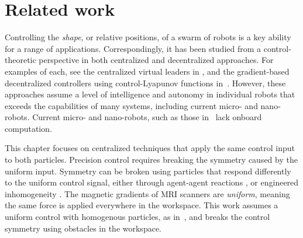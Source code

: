 
\section{Related work}\label{sec:RelatedWork}

Controlling the \emph{shape}, or relative positions, of a swarm of robots is a key ability for a range of applications.  Correspondingly, it has been studied from a control-theoretic perspective in  both centralized and decentralized approaches. For examples of each, see the centralized virtual leaders in \cite{egerstedt2001formation}, and the  gradient-based decentralized controllers  using control-Lyapunov functions in~\cite{hsieh2008decentralized}. However, these approaches assume a level of intelligence and autonomy in individual robots that exceeds the capabilities of many systems, including current micro- and nano-robots.  Current micro- and nano-robots, such as those in~\cite{Chowdhury2015,martel2015magnetotactic,Xiaohui2015magnetiteMicroswimmers} lack onboard computation.

This chapter focuses on centralized techniques that apply the same control input to both particles. 
Precision control requires breaking the symmetry caused by the uniform input.  
Symmetry can be broken using particles that respond differently to the uniform control signal, either through agent-agent reactions \cite{bertozzi2015ring}, or engineered inhomogeneity  \cite{Donald2013,bretl2007,beckerIJRR2014}. 
 The magnetic gradients of MRI scanners are \emph{uniform}, meaning the same force is applied everywhere in the workspace\cite{nosrati2018development}.
 This work assumes a uniform control with homogenous particles, as in~\cite{AaronManipulation2013}, and breaks the control symmetry using obstacles in the workspace. 



